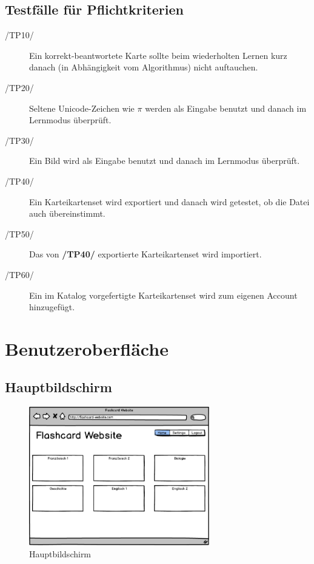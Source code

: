\subsection{Testfälle für Pflichtkriterien}
\begin{description}
	\item[/TP10/] Ein korrekt-beantwortete Karte sollte beim wiederholten Lernen kurz danach (in Abhängigkeit vom Algorithmus) nicht auftauchen.
	\item[/TP20/] Seltene Unicode-Zeichen wie \(\pi\) werden als Eingabe benutzt und danach im Lernmodus überprüft.
	\item[/TP30/] Ein Bild wird als Eingabe benutzt und danach im Lernmodus überprüft.
	\item[/TP40/] Ein Karteikartenset wird exportiert und danach wird getestet, ob die Datei auch übereinstimmt.
	\item[/TP50/] Das von \textbf{/TP40/} exportierte Karteikartenset wird importiert.
	\item[/TP60/] Ein im Katalog vorgefertigte Karteikartenset wird zum eigenen Account hinzugefügt.
\end{description}

\section{Benutzeroberfläche}
\subsection{Hauptbildschirm}

\begin{figure}[H]
    \centering
    \includegraphics[width=0.7\textwidth]{images/Overview.png}
    \caption{Hauptbildschirm}
    \label{fig:overview}
\end{figure}

